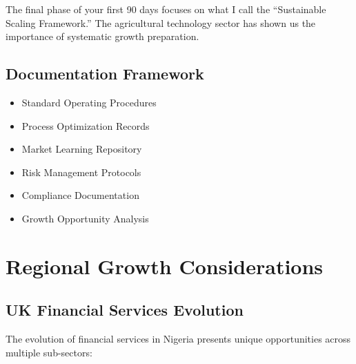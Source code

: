 The final phase of your first 90 days focuses on what I call the ``Sustainable Scaling Framework.'' The agricultural technology sector has shown us the importance of systematic growth preparation.


\subsection{Documentation Framework}\label{subsec:documentation-framework}
\begin{tcolorbox}[colback=white,colframe=primarydark,title=\textbf{Critical Documentation Areas}]
\begin{itemize}
    \item Standard Operating Procedures
    \item Process Optimization Records
    \item Market Learning Repository
    \item Risk Management Protocols
    \item Compliance Documentation
    \item Growth Opportunity Analysis
\end{itemize}
\end{tcolorbox}

\section{Regional Growth Considerations}\label{sec:regional-growth}

\subsection{UK Financial Services Evolution}\label{subsec:uk-financial}
The evolution of financial services in Nigeria presents unique opportunities across multiple sub-sectors:

